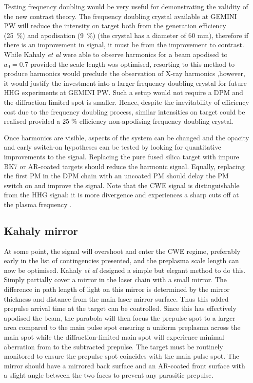 Testing frequency doubling would be very useful for demonstrating the validity of the new contrast theory. The frequency doubling crystal available at GEMINI PW will reduce the intensity on target both from the generation efficiency (\qty{25}{\%}) and apodisation (\qty{9}{\%}) (the crystal has a diameter of 60 mm), therefore if there is an improvement in signal, it must be from the improvement to contrast. While Kahaly \textit{et al} were able to observe harmonics for a beam apodised to $a_0 = 0.7$ provided the scale length was optimised, resorting to this method to produce harmonics would preclude the observation of X-ray harmonics ,however, it would justify the investment into a larger frequency doubling crystal for future HHG experiments at GEMINI PW. Such a setup would not require a DPM and the diffraction limited spot is smaller. Hence, despite the inevitability of efficiency cost due to the frequency doubling process, similar intensities on target could be realised provided a 25 \% efficiency non-apodising frequency doubling crystal.

Once harmonics are visible, aspects of the system can be changed and the opacity and early switch-on hypotheses can be tested by looking for quantitative improvements to the signal. Replacing the pure fused silica target with impure BK7 or AR-coated targets should reduce the harmonic signal. Equally, replacing the first PM in the DPM chain with an uncoated PM should delay the PM switch on and improve the signal. Note that the CWE signal is distinguishable from the HHG signal: it is more divergence and experiences a sharp cuts off at the plasma frequency \cite{kahalyDirectObservationDensityGradient2013}.

\subsection{Kahaly mirror}
At some point, the signal will overshoot and enter the CWE regime, preferably early in the list of contingencies presented, and the preplasma scale length can now be optimised. Kahaly \textit{et al} \cite{kahalyDirectObservationDensityGradient2013} designed a simple but elegant method to do this. Simply partially cover a mirror in the laser chain with a small mirror. The difference in path length of light on this mirror is determined by the mirror thickness and distance from the main laser mirror surface. Thus this added prepulse arrival time at the target can be controlled. Since this has effectively apodised the beam, the parabola will then focus the prepulse spot to a larger area compared to the main pulse spot ensuring a uniform preplasma across the main spot while the diffraction-limited main spot will experience minimal aberration from to the subtracted prepulse. The target must be routinely monitored to ensure the prepulse spot coincides with the main pulse spot. The mirror should have a mirrored back surface and an AR-coated front surface with a slight angle between the two faces to prevent any parasitic prepulse.

